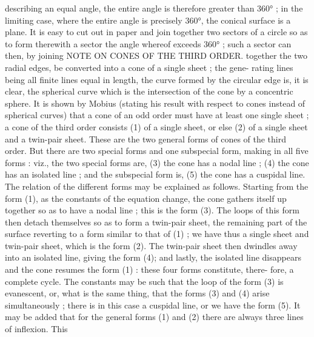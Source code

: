 \documentclass[11pt,a4paper]{book}
\begin{document}
describing  an  equal  angle,  the  entire  angle  is  therefore  greater  than  360° ;  in  the
limiting  case,  where  the  entire  angle  is  precisely  360°,  the  conical  surface  is  a  plane.
It  is  easy  to  cut  out  in  paper  and  join  together  two  sectors  of  a  circle  so  as  to  form
therewith  a  sector  the   angle   whereof  exceeds   360° ;   such   a  sector  can  then,  by  joining
NOTE   ON    CONES   OF   THE   THIRD   ORDER.
together  the  two  radial  edges,  be  converted  into  a  cone  of  a  single  sheet ;  the  gene-
rating lines  being  all  finite  lines  equal  in  length,  the  curve  formed  by  the  circular
edge  is,  it  is  clear,  the  spherical  curve  which  is  the  intersection  of  the  cone  by
a  concentric  sphere.  It  is  shown  by  Mobius  (stating  his  result  with  respect  to  cones
instead  of  spherical  curves)  that  a  cone  of  an  odd  order  must  have  at  least  one  single
sheet ;  a  cone  of  the  third  order  consists  (1)  of  a  single  sheet,  or  else  (2)  of  a  single
sheet  and  a  twin-pair  sheet.  These  are  the  two  general  forms  of  cones  of  the  third
order.  But  there  are  two  special  forms  and  one  subspecial  form,  making  in  all  five
forms :  viz.,  the  two  special  forms  are,  (3)  the  cone  has  a  nodal  line ;  (4)  the  cone
has  an  isolated  line ;  and  the  subspecial  form  is,  (5)  the  cone  has  a  cuspidal  line.  The
relation  of  the  different  forms  may  be  explained  as  follows.
Starting  from  the  form  (1),  as  the  constants  of  the  equation  change,  the  cone
gathers  itself  up  together  so  as  to  have  a  nodal  line ;  this  is  the  form  (3).  The
loops  of  this  form  then  detach  themselves  so  as  to  form  a  twin-pair  sheet,  the
remaining  part  of  the  surface  reverting  to  a  form  similar  to  that  of  (1) ;  we  have
thus  a  single  sheet  and  twin-pair  sheet,  which  is  the  form  (2).  The  twin-pair  sheet
then  dwindles  away  into  an  isolated  line,  giving  the  form  (4);  and  lastly,  the  isolated
line   disappears   and   the   cone  resumes  the  form  (1) :   these  four  forms  constitute,  there-
fore, a  complete  cycle.  The  constants  may  be  such  that  the  loop  of  the  form  (3)  is
evanescent,  or,  what  is  the  same  thing,  that  the  forms  (3)  and  (4)  arise  simultaneously ;
there  is  in  this  case  a  cuspidal  line,  or  we  have  the  form  (5).  It  may  be  added
that  for  the  general  forms  (1)  and  (2)  there  are  always  three  lines  of  inflexion.  This
\end{document}
